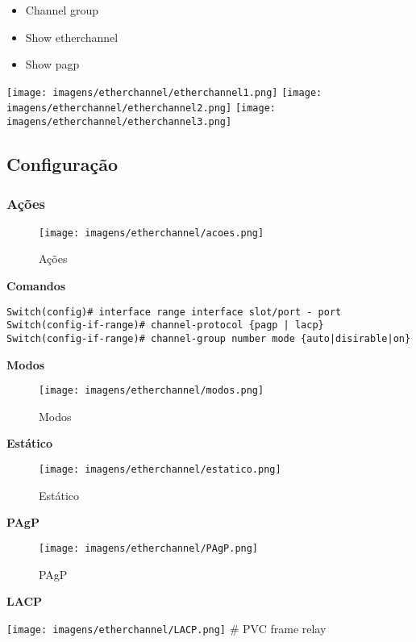 \documentclass[]{article}
\begin{document}
\begin{itemize}
\item
  Channel group
\item
  Show etherchannel
\item
  Show pagp
\end{itemize}

\texttt{[image: imagens/etherchannel/etherchannel1.png]}
\texttt{[image: imagens/etherchannel/etherchannel2.png]}
\texttt{[image: imagens/etherchannel/etherchannel3.png]}

\subsection{Configuração}\label{configurauxe7uxe3o}

\subsubsection{Ações}\label{auxe7uxf5es}

\begin{figure}[htbp]
\centering
\texttt{[image: imagens/etherchannel/acoes.png]}
\caption{Ações}
\end{figure}

\textbf{Comandos}

\begin{verbatim}
Switch(config)# interface range interface slot/port - port
Switch(config-if-range)# channel-protocol {pagp | lacp}
Switch(config-if-range)# channel-group number mode {auto|disirable|on}
\end{verbatim}

\textbf{Modos}

\begin{figure}[htbp]
\centering
\texttt{[image: imagens/etherchannel/modos.png]}
\caption{Modos}
\end{figure}

\textbf{Estático}

\begin{figure}[htbp]
\centering
\texttt{[image: imagens/etherchannel/estatico.png]}
\caption{Estático}
\end{figure}

\textbf{PAgP}

\begin{figure}[htbp]
\centering
\texttt{[image: imagens/etherchannel/PAgP.png]}
\caption{PAgP}
\end{figure}

\textbf{LACP}

\texttt{[image: imagens/etherchannel/LACP.png]} \# PVC frame relay
\end{document}
